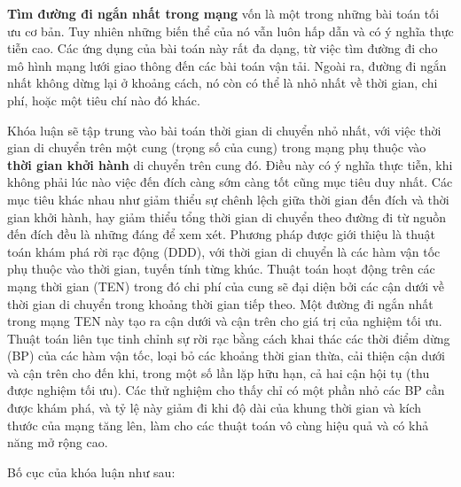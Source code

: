 \documentclass[fontsize=14pt,DIV=15pt,twoside=false]{scrbook}
\begin{document}

\textbf{Tìm đường đi ngắn nhất trong mạng} vốn là một trong những bài toán tối ưu cơ bản. Tuy nhiên những biến thể  của nó vẫn luôn hấp dẫn và có ý nghĩa thực tiễn cao. Các ứng dụng của bài toán này rất đa dạng, từ việc tìm đường đi cho mô hình mạng lưới giao thông đến các bài toán vận tải.
Ngoài ra, đường đi ngắn nhất không dừng lại ở khoảng cách, nó còn có thể là nhỏ nhất về thời gian, chi phí, hoặc một tiêu chí nào đó khác. 

Khóa luận sẽ tập trung vào bài toán thời gian di chuyển nhỏ nhất, với việc thời gian di chuyển trên một cung (trọng số của cung) trong mạng phụ thuộc vào \textbf{thời gian khởi hành} di chuyển trên cung đó. Điều này có ý nghĩa thực tiễn, khi không phải lúc nào việc đến đích càng sớm càng tốt cũng mục tiêu duy nhất. 
Các mục tiêu khác nhau như giảm thiểu sự chênh lệch giữa thời gian đến đích và thời gian khởi hành, hay giảm thiểu tổng thời gian di chuyển theo đường đi từ nguồn đến đích đều là những đáng để xem xét.
Phương pháp được giới thiệu là thuật toán khám phá rời rạc động (DDD), với thời gian di chuyển là các hàm vận tốc phụ thuộc vào thời gian, tuyến tính từng khúc. 
Thuật toán hoạt động trên các mạng thời gian (TEN) trong đó chi phí của cung sẽ đại diện bởi các cận dưới về thời gian di chuyển trong khoảng thời gian tiếp theo. 
Một đường đi ngắn nhất trong mạng TEN này tạo ra cận dưới và cận trên cho giá trị của nghiệm tối ưu. 
Thuật toán liên tục tinh chỉnh sự rời rạc bằng cách khai thác các thời điểm dừng (BP) của các hàm vận tốc, loại bỏ các khoảng thời gian thừa, cải thiện cận dưới và cận trên cho đến khi, trong một số lần lặp hữu hạn, cả hai cận hội tụ (thu được nghiệm tối ưu). 
Các thử nghiệm cho thấy chỉ có một phần nhỏ các BP cần được khám phá, và tỷ lệ này giảm đi khi độ dài của khung thời gian và kích thước của mạng tăng lên, làm cho các thuật toán vô cùng hiệu quả và có khả năng mở rộng cao.

Bố cục của khóa luận như sau:
\end{document}
